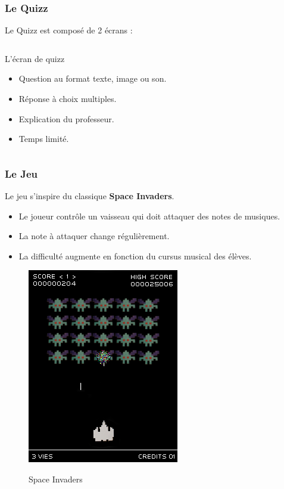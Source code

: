 \begin{frame}
  \frametitle{Le Quizz}
  Le Quizz est composé de 2 écrans :
  \begin{columns}[t]
    \begin{column}{10cm}
      \begin{exampleblock}{L'écran de quizz}
	\begin{itemize}
        \item Question au format texte, image ou son.
        \item Réponse à choix multiples.
        \item Explication du professeur.
        \item Temps limité.
        \end{itemize}
      \end{exampleblock} 
    \end{column}
  \end{columns}  
\end{frame}

\begin{frame}
  \frametitle{Le Jeu}
  Le jeu s'inspire du classique \textbf{Space Invaders}.
  \begin{itemize}
    \item Le joueur contrôle un vaisseau qui doit attaquer des notes de musiques.
    \item La note à attaquer change régulièrement.
    \item La difficulté augmente en fonction du cursus musical des élèves.  
  \end{itemize}

  \begin{figure}[!h]
    \centering
    \includegraphics[height = 0.5\textheight]{img/Space_Invaders.png}
    \label{Space Invaders} 
    \caption{Space Invaders}
  \end{figure}
\end{frame}

